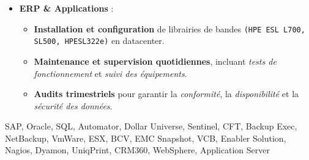 \begin{experiences}
{\begin{itemize}[left=0pt,label={},itemsep=0.5em]
          \vspace{0.3em}

          \item \textbf{ERP \& Applications} :
            \begin{itemize}[itemsep=0.2em,topsep=0.2em,parsep=0pt]
              \small
              \item \textbf{Installation et configuration} de librairies de bandes \texttt{(HPE ESL L700, SL500, HPESL322e)} en datacenter.  
              \item \textbf{Maintenance et supervision quotidiennes}, incluant \emph{tests de fonctionnement} et \emph{suivi des équipements}.  
              \item \textbf{Audits trimestriels} pour garantir la \emph{conformité}, la \emph{disponibilité} et la \emph{sécurité des données}.
            \end{itemize}
        \end{itemize}
        \vspace{0.3em}
    }
    {SAP, Oracle, SQL, Automator, Dollar Universe, Sentinel, CFT, Backup Exec, NetBackup, VmWare, ESX, BCV, EMC Snapshot, VCB, Enabler Solution, Nagios, Dyamon, UniqPrint, CRM360, WebSphere, Application Server}

\emptySeparator
\end{experiences}